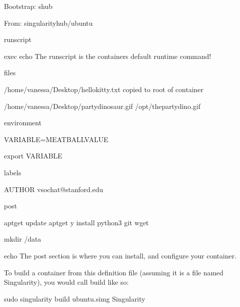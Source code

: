 \documentclass[letterpaper,10pt,english]{sphinxmanual}
\begin{document}
%
\begin{sphinxVerbatim}[commandchars=\\\{\}]
Bootstrap: shub

From: singularityhub/ubuntu


\PYGZpc{}runscript

    exec echo \PYGZdq{}The runscript is the containers default runtime command!\PYGZdq{}


\PYGZpc{}files

   /home/vanessa/Desktop/hello\PYGZhy{}kitty.txt        \PYGZsh{} copied to root of container

   /home/vanessa/Desktop/party\PYGZus{}dinosaur.gif     /opt/the\PYGZhy{}party\PYGZhy{}dino.gif \PYGZsh{}


\PYGZpc{}environment

    VARIABLE=MEATBALLVALUE

    export VARIABLE


\PYGZpc{}labels

   AUTHOR vsochat@stanford.edu


\PYGZpc{}post

    apt\PYGZhy{}get update \PYGZam{}\PYGZam{} apt\PYGZhy{}get \PYGZhy{}y install python3 git wget

    mkdir /data

    echo \PYGZdq{}The post section is where you can install, and configure your container.\PYGZdq{}
\end{sphinxVerbatim}

To build a container from this definition file (assuming it is a file
named Singularity), you would call build like so:

%
\begin{sphinxVerbatim}[commandchars=\\\{\}]
\PYGZdl{} sudo singularity build ubuntu.simg Singularity
\end{sphinxVerbatim}
\end{document}
